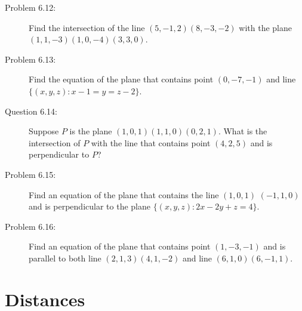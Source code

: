 \documentclass{article}
\begin{document}
\begin{description}
  \item[Problem 6.12:] Find the intersection of the line $(5, -1, 2) (8, -3, -2)$ with the plane $(1, 1, -3) (1, 0, -4) (3, 3, 0)$.

  \item[Problem 6.13:] Find the equation of the plane that contains point $(0, -7, -1)$ and line $\{ (x,y,z): x-1 = y = z-2 \}$.

  \item[Question 6.14:] Suppose $P$ is the plane $(1, 0, 1) (1, 1, 0) (0, 2, 1)$. What is the intersection of $P$ with the line that contains point $(4, 2, 5)$ and is perpendicular to $P$?

  \item[Problem 6.15:] Find an equation of the plane that contains the line $(1, 0, 1)$ $(-1, 1, 0)$ and is perpendicular to the plane $\{ (x,y,z): 2x-2y+z = 4 \}$.

  \item[Problem 6.16:] Find an equation of the plane that contains point $(1, -3, -1)$ and is parallel to both line $(2, 1, 3) (4, 1, -2)$ and line $(6, 1, 0) (6, -1, 1)$.

\end{description}


\section{Distances}
\end{document}
